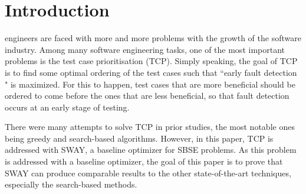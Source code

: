 \documentclass[10pt,journal,compsoc]{IEEEtran}
\begin{document}
	\section{Introduction}
	\label{sec:introduction}
	\fi
	
	
	
	
	 engineers are faced with more and more problems with the growth of the software industry. Among many software engineering tasks, one of the most important problems is the test case prioritisation (TCP).
	Simply speaking, the goal of TCP is to find some optimal ordering of the test cases such that ``early fault detection " is maximized.
	For this to happen, test cases that are more beneficial should be ordered to come before the ones that are less beneficial, so that fault detection occurs at an early stage of testing. 
	
	There were many attempts to solve TCP in prior studies, the most notable ones being greedy and search-based algorithms. However, in this paper, TCP is addressed with SWAY, a baseline optimizer for SBSE problems. As this problem is addressed with a baseline optimizer, the goal of this paper is to prove that SWAY can produce comparable results to the other state-of-the-art techniques, especially the search-based methods.
	
\end{document}
